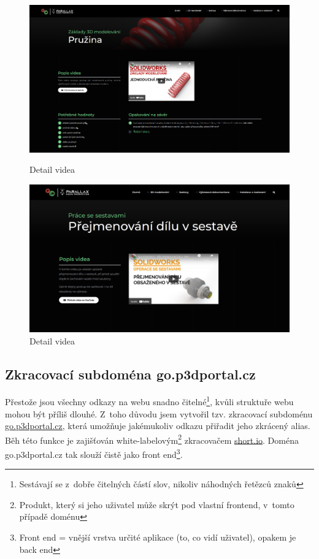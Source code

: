 \begin{figure}[htbp]
    \centering
    \begin{minipage}[b]{0.45\textwidth}
        \centering
        \includegraphics[width=1\textwidth]{img/020/web/web-3D.png}
        \caption{Detail videa}
        \label{fig:p3dportal-3D}
    \end{minipage}
    \qquad
    \begin{minipage}[b]{0.45\textwidth}
        \centering
        \includegraphics[width=1\textwidth]{img/020/web/web-assembly.png}
        \caption{Detail videa}
        \label{fig:p3dportal-assembly}
    \end{minipage}
\end{figure}

\subsection{Zkracovací subdoména go.p3dportal.cz}
Přestože jsou všechny odkazy na webu snadno čitelné\footnote{Sestávají se z~dobře čitelných částí slov, nikoliv náhodných řetězců znaků}, kvůli struktuře webu mohou být příliš dlouhé.
Z~toho důvodu jsem vytvořil tzv. zkracovací subdoménu \href{https://go.p3dportal.cz}{go.p3dportal.cz}, která umožňuje jakémukoliv odkazu přiřadit jeho zkrácený alias.
Běh této funkce je zajišťován white-labelovým\footnote{Produkt, který si jeho uživatel může skrýt pod vlastní frontend, v~tomto případě doménu} zkracovačem \href{https://short.io}{short.io}.
Doména go.p3dportal.cz tak slouží čistě jako front end\footnote{Front end = vnější vrstva určité aplikace (to, co vidí uživatel), opakem je back end}.
